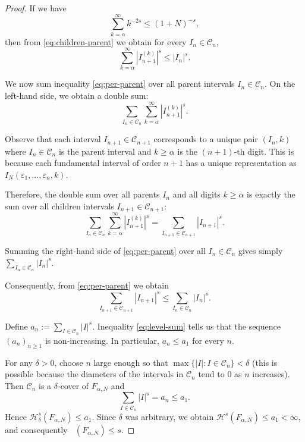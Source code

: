 \documentclass[12pt]{article}
\newcommand{\Ha}{\mathcal{H}}
\numberwithin{equation}{section}
\DeclareMathOperator{\dimH}{dim_H}
\begin{document}
\begin{proof}
If we have
\begin{equation}\label{eq:key-condition}
\sum_{k=\alpha}^{\infty} k^{-2s} \leq (1+N)^{-s},
\end{equation}
then from \eqref{eq:children-parent} we obtain for every $I_n \in \mathcal{C}_n$,
\begin{equation}\label{eq:per-parent}
\sum_{k=\alpha}^{\infty} |I_{n+1}^{(k)}|^s \leq |I_n|^s .
\end{equation}

We now sum inequality \eqref{eq:per-parent} over all parent intervals $I_n \in \mathcal{C}_n$. 
On the left-hand side, we obtain a double sum:
\[
\sum_{I_n \in \mathcal{C}_n} \sum_{k=\alpha}^{\infty} |I_{n+1}^{(k)}|^s .
\]

Observe that each interval $I_{n+1} \in \mathcal{C}_{n+1}$ corresponds to a unique pair 
$(I_n, k)$ where $I_n \in \mathcal{C}_n$ is the parent interval and $k \geq \alpha$ is the 
$(n+1)$-th digit. This is because each fundamental interval of order $n+1$ has a unique 
representation as $I_N(\varepsilon_1, \dots, \varepsilon_n, k)$. 

Therefore, the double sum over all parents $I_n$ and all digits $k \geq \alpha$ is exactly 
the sum over all children intervals $I_{n+1} \in \mathcal{C}_{n+1}$:
\[
\sum_{I_n \in \mathcal{C}_n} \sum_{k=\alpha}^{\infty} |I_{n+1}^{(k)}|^s 
= \sum_{I_{n+1} \in \mathcal{C}_{n+1}} |I_{n+1}|^s .
\]

Summing the right-hand side of \eqref{eq:per-parent} over all $I_n \in \mathcal{C}_n$ gives 
simply $\sum_{I_n \in \mathcal{C}_n} |I_n|^s$.

Consequently, from \eqref{eq:per-parent} we obtain
\begin{equation}\label{eq:level-sum}
\sum_{I_{n+1} \in \mathcal{C}_{n+1}} |I_{n+1}|^s \leq \sum_{I_n \in \mathcal{C}_n} |I_n|^s .
\end{equation}

Define $a_n := \sum_{I \in \mathcal{C}_n} |I|^s$. Inequality \eqref{eq:level-sum} tells us that 
the sequence $(a_n)_{n\geq 1}$ is non‑increasing. In particular, $a_n \leq a_1$ for every $n$.

For any $\delta > 0$, choose $n$ large enough so that $\max\{|I| : I \in \mathcal{C}_n\} < \delta$
(this is possible because the diameters of the intervals in $\mathcal{C}_n$ tend to $0$ as $n$ increases). 
Then $\mathcal{C}_n$ is a $\delta$‑cover of $F_{\alpha,N}$ and
\[
\sum_{I \in \mathcal{C}_n} |I|^s = a_n \leq a_1 .
\]
Hence $\Ha^s_\delta(F_{\alpha,N}) \leq a_1$. Since $\delta$ was arbitrary, we obtain 
$\Ha^s(F_{\alpha,N}) \leq a_1 < \infty$, and consequently $\dimH(F_{\alpha,N}) \leq s$.


\end{proof}
\end{document}
